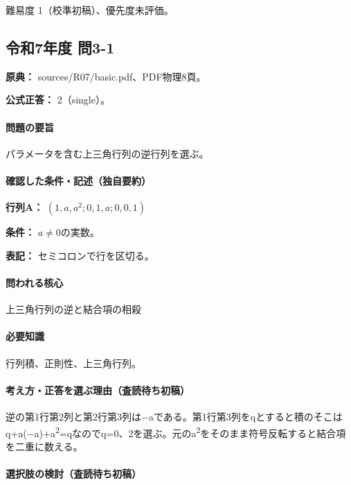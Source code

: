 \par 難易度 1（校準初稿）、優先度未評価。

\subsection{令和7年度 問3-1}
\label{q:r07-reg-basic-3-1}

\noindent\textbf{原典：} sources/R07/basic.pdf、PDF物理8頁。

\textbf{公式正答：} 2（single）。

\paragraph{問題の要旨} パラメータを含む上三角行列の逆行列を選ぶ。

\paragraph{確認した条件・記述（独自要約）}\mbox{}\par

\noindent\textbf{行列A：} \((1,a,a^2;0,1,a;0,0,1)\)\par

\noindent\textbf{条件：} \(a\neq0\)の実数。\par

\noindent\textbf{表記：} セミコロンで行を区切る。\par

\paragraph{問われる核心} 上三角行列の逆と結合項の相殺

\paragraph{必要知識} 行列積、正則性、上三角行列。

\paragraph{考え方・正答を選ぶ理由（査読待ち初稿）} 逆の第1行第2列と第2行第3列は−aである。第1行第3列をqとすると積のそこはq+a(−a)+a\textsuperscript{2}=qなのでq=\allowbreak{}0、2を選ぶ。元のa\textsuperscript{2}をそのまま符号反転すると結合項を二重に数える。

\paragraph{選択肢の検討（査読待ち初稿）}\mbox{}\par

